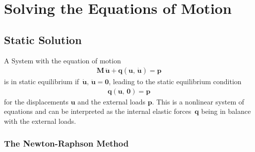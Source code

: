 \chapter{Solving the Equations of Motion}

\section{Static Solution}

A System with the equation of motion
%
\begin{align}
\boldsymbol{M}\,\ddot{\boldsymbol{u}} + \boldsymbol{q}(\boldsymbol{u},\,\dot{\boldsymbol{u}}) = \boldsymbol{p}
\end{align}
%
is in static equilibrium if~$\dot{\boldsymbol{u}},\,\ddot{\boldsymbol{u}} = \boldsymbol{0}$, leading to the static equilibrium condition
%
\begin{align}
\boldsymbol{q}(\boldsymbol{u},\,\boldsymbol{0}) = \boldsymbol{p}\label{eq:statics:equilibrium}
\end{align}
%
for the displacements $\boldsymbol{u}$ and the external loads $\boldsymbol{p}$.
This is a nonlinear system of equations and can be interpreted as the internal elastic forces~$\boldsymbol{q}$ being in balance with the external loads.

\subsection{The Newton-Raphson Method}

